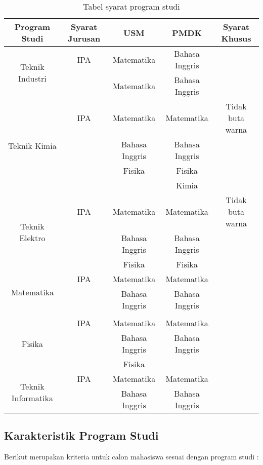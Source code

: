 \begin{table}[H] %
	\centering 
	\caption{Tabel syarat program studi}
	\label{tab:contoh1}
	\begin{tabular}{| c | c | c | c | c |}
		\hline
		Program Studi & Syarat Jurusan & USM  & PMDK & Syarat Khusus\\		
		
		\hline
		\multirow{2}{10em}{Teknik Industri} & IPA & Matematika & Bahasa Inggris & \\
		& & Matematika & Bahasa Inggris & \\
		
		\hline
		\multirow{4}{10em}{Teknik Kimia} & IPA & Matematika & Matematika & Tidak buta warna\\
		& & Bahasa Inggris & Bahasa Inggris & \\
		& & Fisika & Fisika & \\
		& & & Kimia & \\
		
		\hline
		\multirow{3}{10em}{Teknik Elektro} & IPA & Matematika & Matematika & Tidak buta warna \\
		& & Bahasa Inggris & Bahasa Inggris & \\
		& & Fisika & Fisika & \\
		
		\hline
		\multirow{2}{10em}{Matematika} & IPA & Matematika & Matematika & \\
		& & Bahasa Inggris & Bahasa Inggris & \\
		& & & & \\
		
		\hline
		\multirow{3}{10em}{Fisika} & IPA & Matematika & Matematika & \\
		& & Bahasa Inggris & Bahasa Inggris & \\
		& & Fisika & & \\
		
		\hline
		\multirow{2}{10em}{Teknik Informatika} & IPA & Matematika & Matematika & \\
		& & Bahasa Inggris & Bahasa Inggris & \\
		
		\hline		
	\end{tabular} 
\end{table}
	
\subsection{Karakteristik Program Studi}
Berikut merupakan kriteria untuk calon mahasiswa sesuai dengan program studi :

